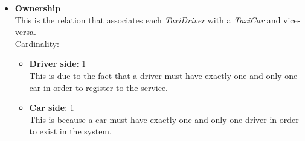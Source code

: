 \begin{itemize}
	\item {\textbf{Ownership}} \\
		This is the relation that associates each \emph{TaxiDriver} with a \emph{TaxiCar} and vice-versa.\\Cardinality: 
		\begin{itemize}
			\item {\textbf{Driver side}}: 1 \\
				This is due to the fact that a driver must have exactly one and only one car in order to register to the service. 
			\item {\textbf{Car side}}: 1 \\
				This is because a car must have exactly one and only one driver in order to exist in the system.
		\end{itemize}
\end{itemize}


